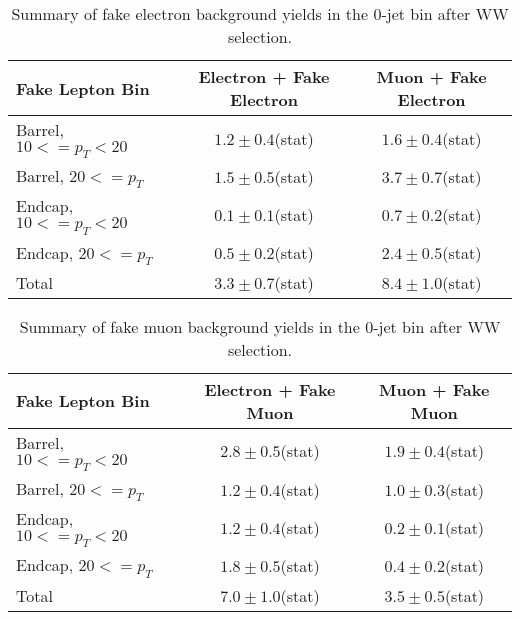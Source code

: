 \begin{table}[!htbp]
\begin{center}
\begin{tabular}{|l|c|c|}
\hline
Fake Lepton Bin               & Electron + Fake Electron & Muon + Fake Electron  \\
\hline
Barrel, $10 <= p_{T} < 20$    &  $1.2 \pm 0.4$(stat)     &   $1.6 \pm 0.4$(stat) \\
Barrel, $20 <= p_{T} $        &  $1.5 \pm 0.5$(stat)     &   $3.7 \pm 0.7$(stat) \\
Endcap, $10 <= p_{T} < 20$    &  $0.1 \pm 0.1$(stat)     &   $0.7 \pm 0.2$(stat) \\
Endcap, $20 <= p_{T} $        &  $0.5 \pm 0.2$(stat)     &   $2.4 \pm 0.5$(stat) \\
\hline
Total                         &  $3.3  \pm 0.7$(stat)    &   $8.4 \pm 1.0$(stat) \\
\hline
\end{tabular}
\caption{Summary of fake electron background yields in the 0-jet bin after WW selection. }
\label{tab:FakeElectronBkgPrediction_WWSelection_0JetBin}
\end{center}
\end{table}

\begin{table}[!htbp]
\begin{center}
\begin{tabular}{|l|c|c|}
\hline
Fake Lepton Bin               & Electron + Fake Muon & Muon + Fake Muon  \\
\hline
Barrel, $10 <= p_{T} < 20$    &  $2.8 \pm 0.5$(stat)     &   $1.9 \pm 0.4$(stat) \\
Barrel, $20 <= p_{T} $        &  $1.2 \pm 0.4$(stat)     &   $1.0 \pm 0.3$(stat) \\
Endcap, $10 <= p_{T} < 20$    &  $1.2 \pm 0.4$(stat)     &   $0.2 \pm 0.1$(stat) \\
Endcap, $20 <= p_{T} $        &  $1.8 \pm 0.5$(stat)     &   $0.4 \pm 0.2$(stat) \\
\hline
Total                         &  $7.0  \pm 1.0$(stat)    &   $3.5 \pm 0.5$(stat) \\
\hline
\end{tabular}
\caption{Summary of fake muon background yields in the 0-jet bin after WW selection. }
\label{tab:FakeElectronBkgPrediction_WWSelection_0JetBin}
\end{center}
\end{table}



